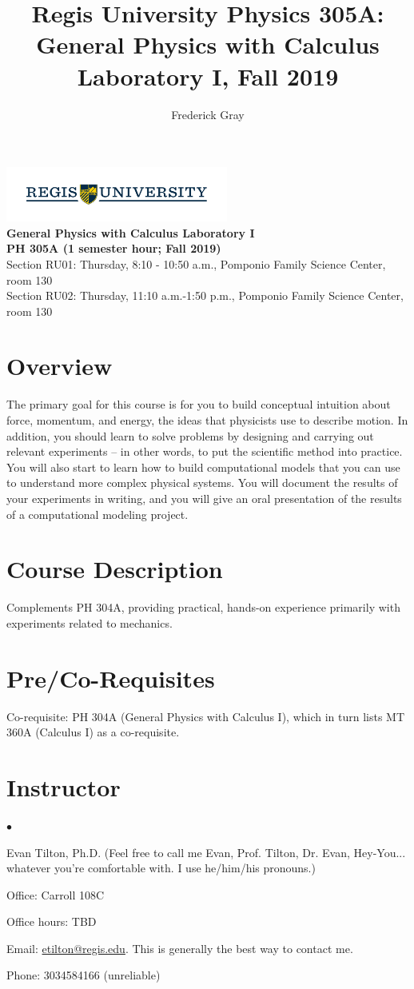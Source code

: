 \documentclass[11pt]{article}
\title{Regis University Physics 305A: General Physics with Calculus Laboratory I, Fall 2019}
\author{Frederick Gray}
\newcommand{\squishlist}{
   \begin{list}{$\bullet$}
    { \setlength{\itemsep}{0pt}      \setlength{\parsep}{3pt}
      \setlength{\topsep}{3pt}       \setlength{\partopsep}{0pt}
      \setlength{\leftmargin}{1.5em} \setlength{\labelwidth}{1em}
      \setlength{\labelsep}{0.5em} } }
\newcommand{\squishend}{
    \end{list}  }
\begin{document}
\begin{center}
\noindent\includegraphics[height=1.8cm] {RegisU_Logo.png}\\
\vspace{-0.5cm}
{\bf{General Physics with Calculus Laboratory I}} \\ 
{\bf{PH 305A (1 semester hour; Fall 2019)}} \\
{{Section RU01: Thursday, 8:10 - 10:50 a.m., Pomponio Family Science Center, room 130}} \\
{{Section RU02: Thursday, 11:10 a.m.-1:50 p.m., Pomponio Family Science Center, room 130}} 
\end{center}

\section{Overview}

The primary goal for this course is for you to build conceptual intuition 
about force, momentum, and energy, the ideas that physicists use to 
describe motion.  In addition, you should learn to solve problems by 
designing and carrying out relevant experiments -- in other words, to put the 
scientific method into practice.  You will also start to learn how to 
build computational models that you can use to understand more complex
physical systems.  You will document the results of your experiments in 
writing, and you will give an oral presentation of the results of a
computational modeling project.

\section{Course Description} 

Complements PH 304A, providing practical, hands-on experience primarily with experiments related to mechanics.

\section{Pre/Co-Requisites}

Co-requisite: PH 304A (General Physics with Calculus I), which in turn lists MT 360A (Calculus I) as a co-requisite.

\section{Instructor}
\squishlist
\item Evan Tilton, Ph.D. (Feel free to call me Evan, Prof. Tilton, Dr. Evan, Hey-You... whatever you're comfortable with. I use he/him/his pronouns.)
\item Office: Carroll 108C
\item Office hours: TBD
\item  Email: \url{etilton@regis.edu}.  This is generally the best way to contact me.
\item Phone: 3034584166 (unreliable)
\squishend
\end{document}
